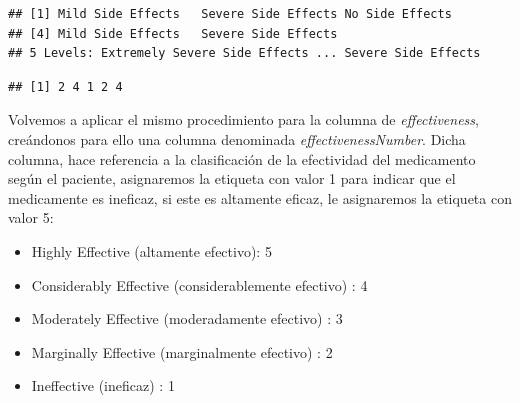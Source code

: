 \documentclass[spanish,]{article}
\newenvironment{Shaded}{\begin{snugshade}}{\end{snugshade}}
\newcommand{\KeywordTok}[1]{\textcolor[rgb]{0.13,0.29,0.53}{\textbf{#1}}}
\newcommand{\DecValTok}[1]{\textcolor[rgb]{0.00,0.00,0.81}{#1}}
\newcommand{\OperatorTok}[1]{\textcolor[rgb]{0.81,0.36,0.00}{\textbf{#1}}}
\newcommand{\NormalTok}[1]{#1}
\providecommand{\tightlist}{%
  \setlength{\itemsep}{0pt}\setlength{\parskip}{0pt}}
\begin{document}
\begin{verbatim}
## [1] Mild Side Effects   Severe Side Effects No Side Effects    
## [4] Mild Side Effects   Severe Side Effects
## 5 Levels: Extremely Severe Side Effects ... Severe Side Effects
\end{verbatim}

\begin{Shaded}
\end{Shaded}

\begin{verbatim}
## [1] 2 4 1 2 4
\end{verbatim}

Volvemos a aplicar el mismo procedimiento para la columna de
\emph{effectiveness}, creándonos para ello una columna denominada
\emph{effectivenessNumber}. Dicha columna, hace referencia a la
clasificación de la efectividad del medicamento según el paciente,
asignaremos la etiqueta con valor 1 para indicar que el medicamente es
ineficaz, si este es altamente eficaz, le asignaremos la etiqueta con
valor 5:

\begin{itemize}
\tightlist
\item
  Highly Effective (altamente efectivo): 5
\item
  Considerably Effective (considerablemente efectivo) : 4
\item
  Moderately Effective (moderadamente efectivo) : 3
\item
  Marginally Effective (marginalmente efectivo) : 2
\item
  Ineffective (ineficaz) : 1
\end{itemize}
\end{document}
